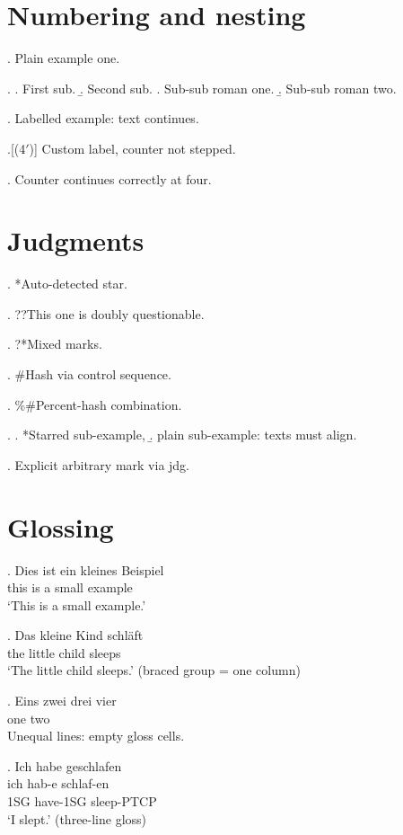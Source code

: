 \documentclass{article}
\begin{document}
\section*{Numbering and nesting}

\ex. Plain example one.

\ex.
\a. First sub.
\b. Second sub.
\a. Sub-sub roman one.
\b. Sub-sub roman two.

\ex.\label{lbl:main} Labelled example: text continues.

\ex.[(4$'$)] Custom label, counter not stepped.

\ex. Counter continues correctly at four.

\section*{Judgments}

\ex. *Auto-detected star.

\ex. ??This one is doubly questionable.

\ex. ?*Mixed marks.

\ex. \#Hash via control sequence.

\ex. \%\#Percent-hash combination.

\ex.
\a. *Starred sub-example,
\b. plain sub-example: texts must align.

\ex. \jdg{\dag}Explicit arbitrary mark via jdg.

\section*{Glossing}

\ex. \gll Dies ist ein kleines Beispiel \\
     this is a small example \\
\glt `This is a small example.'

\ex. \gll Das {kleine Kind} schl\"aft \\
     the {little child} sleeps \\
\glt `The little child sleeps.' (braced group = one column)

\ex. \gll Eins zwei drei vier \\
     one two \\
\glt Unequal lines: empty gloss cells.

\ex. \glll Ich habe geschlafen \\
      ich hab-e schlaf-en \\
      1SG have-1SG sleep-PTCP \\
\glt `I slept.' (three-line gloss)
\end{document}
